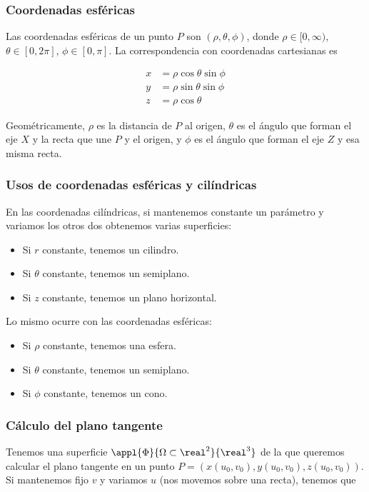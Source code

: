 \documentclass[nochap]{apuntes}
\begin{document}
\subsubsection{Coordenadas esféricas}
Las coordenadas esféricas de un punto $P$ son $(\rho, \theta, \phi)$, donde $\rho \in [0, \infty)$, $\theta\in [0, 2\pi]$, $\phi \in [0, \pi]$. La correspondencia con coordenadas cartesianas es

\begin{align*}
x&=\rho \cos \theta \sin \phi \\
y&= \rho \sin \theta \sin \phi \\
z &= \rho \cos \theta
\end{align*}

Geométricamente, $\rho$ es la distancia de $P$ al origen, $\theta$ es el ángulo que forman el eje $X$ y la recta que une $P$ y el origen, y $\phi$ es el ángulo que forman el eje $Z$ y esa misma recta.

\subsubsection{Usos de coordenadas esféricas y cilíndricas}

En las coordenadas cilíndricas, si mantenemos constante un parámetro y variamos los otros dos obtenemos varias superficies:

\begin{itemize}
\item Si $r$ constante, tenemos un cilindro. 
\item Si $\theta$ constante, tenemos un semiplano. 
\item Si $z$ constante, tenemos un plano horizontal. 
\end{itemize}

Lo mismo ocurre con las coordenadas esféricas:

\begin{itemize}
\item Si $\rho$ constante, tenemos una esfera. 
\item Si $\theta$ constante, tenemos un semiplano.
\item Si $\phi$ constante, tenemos un cono. 
\end{itemize}

\subsubsection{Cálculo del plano tangente}
Tenemos una superficie $\appl{\Phi}{\Omega\subset\real^2}{\real^3}$ de la que queremos calcular el plano tangente en un punto $P = (x(u_0, v_0),y(u_0, v_0),z(u_0, v_0))$. Si mantenemos fijo $v$ y variamos $u$ (nos movemos sobre una recta), tenemos que 
\end{document}
